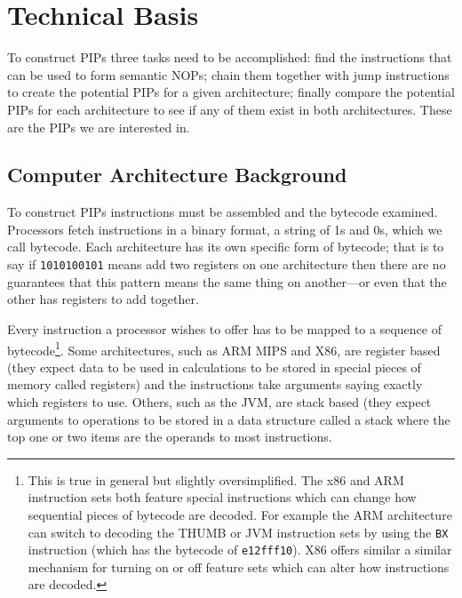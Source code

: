 \documentclass[]{book}
\begin{document}
\chapter{Technical Basis}

To construct PIPs three tasks need to be accomplished: find the
instructions that can be used to form semantic NOPs; chain them together
with jump instructions to create the potential PIPs for a given
architecture; finally compare the potential PIPs for each architecture
to see if any of them exist in both architectures. These are the PIPs we
are interested in.

\section{Computer Architecture Background}

To construct PIPs instructions must be assembled and the bytecode
examined. Processors fetch instructions in a binary format, a string of
1s and 0s, which we call bytecode. Each architecture has its own
specific form of bytecode; that is to say if \lstinline!1010100101!
means add two registers on one architecture then there are no guarantees
that this pattern means the same thing on another---or even that the
other has registers to add together.

Every instruction a processor wishes to offer has to be mapped to a
sequence of bytecode\footnote{This is true in general but slightly
  oversimplified. The x86 and ARM instruction sets both feature special
  instructions which can change how sequential pieces of bytecode are
  decoded. For example the ARM architecture\autocite{Seal:2000vd} can
  switch to decoding the THUMB or JVM instruction sets by using the
  \lstinline!BX! instruction (which has the bytecode of
  \lstinline!e12fff10!). X86\autocite{IntelCorporation:1997ta} offers
  similar a similar mechanism for turning on or off feature sets which
  can alter how instructions are decoded.}. Some architectures, such as
ARM\autocite{Seal:2000vd} MIPS\autocite{MIPSTechnologiesInc:2011ta} and
X86\autocite{IntelCorporation:1997ta}, are register based (they expect
data to be used in calculations to be stored in special pieces of memory
called registers) and the instructions take arguments saying exactly
which registers to use. Others, such as the
JVM\autocite{Lindholm:2012wy}, are stack based (they expect arguments to
operations to be stored in a data structure called a stack where the top
one or two items are the operands to most instructions.
\end{document}
